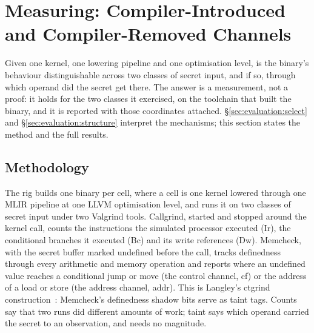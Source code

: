 \section{Measuring: Compiler-Introduced and Compiler-Removed Channels}
\label{sec:measure}

Given one kernel, one lowering pipeline and one optimisation level, is the binary's behaviour distinguishable across two classes of secret input, and if so, through which operand did the secret get there. The answer is a measurement, not a proof: it holds for the two classes it exercised, on the toolchain that built the binary, and it is reported with those coordinates attached. \S\ref{sec:evaluation:select} and \S\ref{sec:evaluation:structure} interpret the mechanisms; this section states the method and the full results.

\subsection{Methodology}

The rig builds one binary per cell, where a cell is one kernel lowered through one MLIR pipeline at one LLVM optimisation level, and runs it on two classes of secret input under two Valgrind tools. Callgrind, started and stopped around the kernel call, counts the instructions the simulated processor executed (Ir), the conditional branches it executed (Bc) and its write references (Dw). Memcheck, with the secret buffer marked undefined before the call, tracks definedness through every arithmetic and memory operation and reports where an undefined value reaches a conditional jump or move (the control channel, cf) or the address of a load or store (the address channel, addr). This is Langley's ctgrind construction~\cite{langley2010ctgrind}: Memcheck's definedness shadow bits serve as taint tags. Counts say that two runs did different amounts of work; taint says which operand carried the secret to an observation, and needs no magnitude.

